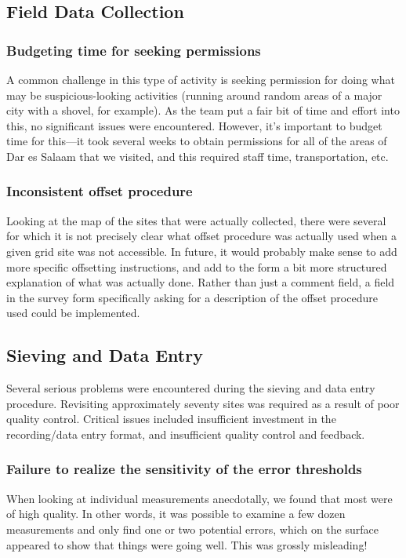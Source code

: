 \documentclass[a4paper,12pt]{article}
\begin{document}
\subsection{Field Data Collection}
\label{fielddatacollection}

\subsubsection{Budgeting time for seeking permissions}
A common challenge in this type of activity is seeking permission for doing what may be suspicious-looking activities (running around random areas of a major city with a shovel, for example). As the team put a fair bit of time and effort into this, no significant issues were encountered. However, it's important to budget time for this---it took several weeks to obtain permissions for all of the areas of Dar es Salaam that we visited, and this required staff time, transportation, etc.

\subsubsection{Inconsistent offset procedure}
Looking at the map of the sites that were actually collected, there were several for which it is not precisely clear what offset procedure was actually used when a given grid site was not accessible. In future, it would probably make sense to add more specific offsetting instructions, and add to the form a bit more structured explanation of what was actually done. Rather than just a comment field, a field in the survey form specifically asking for a description of the offset procedure used could be implemented.

\subsection{Sieving and Data Entry}

Several serious problems were encountered during the sieving and data entry procedure. Revisiting approximately seventy sites was required as a result of poor quality control. Critical issues included insufficient investment in the recording/data entry format, and insufficient quality control and feedback.

\subsubsection{Failure to realize the sensitivity of the error thresholds}
When looking at individual measurements anecdotally, we found that most were of high quality. In other words, it was possible to examine a few dozen measurements and only find one or two potential errors, which on the surface appeared to show that things were going well. This was grossly misleading!
\end{document}
